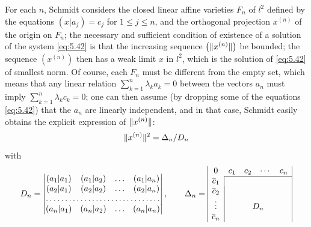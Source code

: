 \documentclass[12pt,a4paper,leqno,twoside]{extbook}
\DeclarePairedDelimiter{\norm}{\lVert}{\rVert}
\begin{document}
For each \(n\), Schmidt considers the closed linear affine varieties \(F_n\) of \(l^2\) defined by the equations \((x|a_j) = c_j\) for \(1 \leq j \leq n\), and the orthogonal projection \(x^{(n)}\) of the origin on \(F_n\); the necessary and sufficient condition of existence of a solution of the system \eqref{eq:5.42} is that the increasing sequence \(\left(\norm{x^{(n)}}\right)\) be bounded; the sequence \(\left(x^{(n)}\right)\) then has a weak limit \(x\) in \(l^2\), which is the solution of \eqref{eq:5.42} of smallest norm. Of course, each \(F_n\) must be different from the empty set, which means that any linear relation \(\sum\limits_{k=1}^n \lambda_k a_k = 0\) between the vectors \(a_n\) must imply \(\sum\limits_{k=1}^n \lambda_k c_k = 0\); one can then assume (by dropping some of the equations \eqref{eq:5.42}) that the \(a_n\) are linearly independent, and in that case, Schmidt easily obtains the explicit expression of \(\norm{x^{(n)}}\):
\begin{equation}
    \label{eq:5.43}
    \norm{x^{(n)}}^2 = \Delta_n / D_n
\end{equation}
with
\begin{equation}
    \label{eq:5.44}
    D_n =
    \left|
    \begin{matrix}
        (a_1 | a_1) & (a_1 | a_2) & \ldots & (a_1 | a_n) \\
        (a_2 | a_1) & (a_2 | a_2) & \ldots & (a_2 | a_n) \\
        \hdotsfor{4} \\
        (a_n | a_1) & (a_n | a_2) & \ldots & (a_n | a_n) \\
    \end{matrix}
    \right|
    , \qquad
    \Delta_n =
    \begin{array}{|c c c c c|}
    0 & c_1 & c_2 & \cdots & c_n \\
    \cline{2-5}
    \multicolumn{1}{|c|}{\overline{c}_1} & & & & \\
    \multicolumn{1}{|c|}{\overline{c}_2} &
    \multicolumn{4}{|c|}{} \\
    \multicolumn{1}{|c|}{\vdots} &
    \multicolumn{4}{|c|}{D_n} \\
    \multicolumn{1}{|c|}{\overline{c}_n} &
    \multicolumn{4}{|c|}{} \\
    \end{array}
\end{equation}
\end{document}
